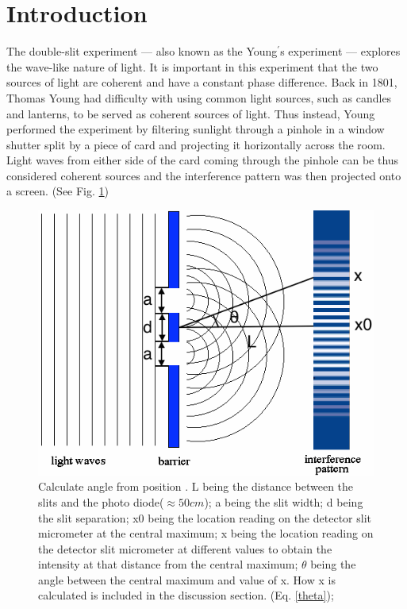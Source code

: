\documentclass[prb,preprint]{revtex4-1}
\begin{document}
\maketitle 

\section{Introduction}
The double-slit experiment --- also known as the Young$^\prime$s experiment --- explores the wave-like nature of light. It is important in this experiment that the two sources of light are coherent and have a constant phase difference.
Back in 1801, Thomas Young had difficulty with using common light sources, such as candles and lanterns, to be served as coherent sources of light. Thus instead, Young performed the experiment by filtering sunlight through a pinhole in a window shutter split by a piece of card and projecting it horizontally across the room. Light waves from either side of the card coming through the pinhole can be thus considered coherent sources and the interference pattern was then projected onto a screen. (See Fig. \ref{interference})

\begin{figure}[h]
\centering
\includegraphics[width=5in]{interference.png}
\caption{Calculate angle from position \cite{interference}. L being the distance between the slits and the photo diode($\approx50cm$); a being the slit width; d being the slit separation; x0 being the location reading on the detector slit micrometer at the central maximum; x being the location reading on the detector slit micrometer at different values to obtain the intensity at that distance from the central maximum; $\theta$ being the angle between the central maximum and value of x. How x is calculated is included in the discussion section. (Eq. \ref{theta}); }
\label{interference}
\end{figure}
\end{document}
